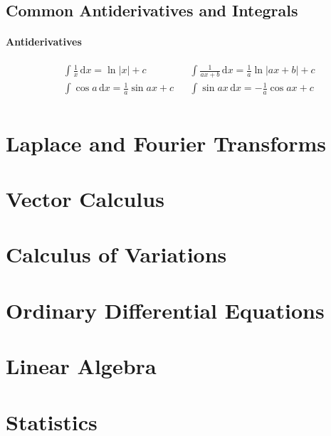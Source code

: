 \documentclass[12pt]{article}
\newcommand{\der}[1]{\, \mathrm{d}#1}
\begin{document}
\subsection{Common Antiderivatives and Integrals}
\paragraph{Antiderivatives}
\begin{align*}
&\int\frac{1}{x}\der{x} = \ln|x| + c & &\int{\frac{1}{ax + b}\der{x}} = \frac{1}{a}\ln|ax+b| + c \\
&\int \cos a \der{x}= \frac1a \sin ax + c & &\int \sin ax\der{x}= - \frac1a \cos ax + c \\
&
\end{align*}
\section{Laplace and Fourier Transforms}
\section{Vector Calculus}
\section{Calculus of Variations}
\section{Ordinary Differential Equations}
\section{Linear Algebra}
\section{Statistics}
\end{document}
